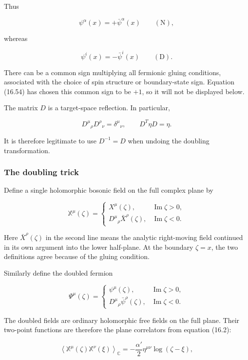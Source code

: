 \documentclass[
  10pt,
  a4paper,
  openany]{book}
\begin{document}
Thus

\[
\psi^\alpha(x)=+\bar\psi^\alpha(x)
\qquad(\mathrm N),
\]

whereas

\[
\psi^i(x)=-\bar\psi^i(x)
\qquad(\mathrm D).
\]

There can be a common sign multiplying all fermionic gluing conditions,
associated with the choice of spin structure or boundary-state sign.
Equation (16.54) has chosen this common sign to be \(+1\), so it will
not be displayed below.

The matrix \(D\) is a target-space reflection. In particular,

\[
D^\mu{}_\rho D^\rho{}_\nu=\delta^\mu{}_\nu,
\qquad
D^T\eta D=\eta.
\]

It is therefore legitimate to use \(D^{-1}=D\) when undoing the doubling
transformation.

\subsubsection{The doubling trick}\label{the-doubling-trick}

Define a single holomorphic bosonic field on the full complex plane by

\[
\mathbb X^\mu(\zeta)
=
\begin{cases}
X^\mu(\zeta),&\operatorname{Im}\zeta>0,\\[2mm]
D^\mu{}_\rho\bar X^\rho(\zeta),&\operatorname{Im}\zeta<0.
\end{cases}
\]

Here \(\bar X^\rho(\zeta)\) in the second line means the analytic
right-moving field continued in its own argument into the lower
half-plane. At the boundary \(\zeta=x\), the two definitions agree
because of the gluing condition.

Similarly define the doubled fermion

\[
\Psi^\mu(\zeta)
=
\begin{cases}
\psi^\mu(\zeta),&\operatorname{Im}\zeta>0,\\[2mm]
D^\mu{}_\rho\bar\psi^\rho(\zeta),&\operatorname{Im}\zeta<0.
\end{cases}
\]

The doubled fields are ordinary holomorphic free fields on the full
plane. Their two-point functions are therefore the plane correlators
from equation (16.2):

\[
\left\langle\mathbb X^\mu(\zeta)\mathbb X^\nu(\xi)\right\rangle_{\mathbb C}
=-\frac{\alpha'}2\eta^{\mu\nu}\log(\zeta-\xi),
\]
\end{document}
